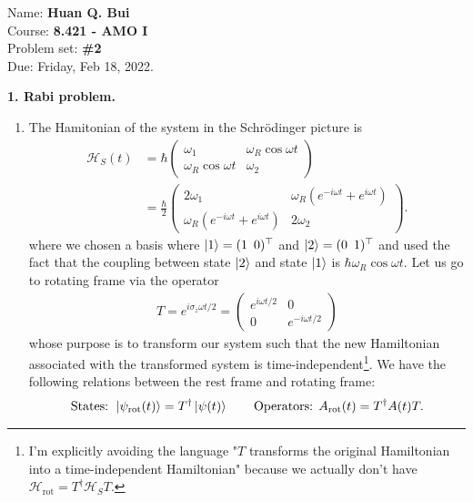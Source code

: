 \documentclass{article}
\theoremstyle{definition}
\newcommand{\ham}{\mathcal{H}}
\newcommand{\f}[2]{\frac{#1}{#2}}
\begin{document}
\begin{framed}
\noindent Name: \textbf{Huan Q. Bui}\\
Course: \textbf{8.421 - AMO I}\\
Problem set: \textbf{\#2}\\
Due: Friday, Feb 18, 2022.
\end{framed}
	
	
\noindent \textbf{1. Rabi problem.}


\begin{enumerate}[label=\alph*)]
	\item The Hamitonian of the system in the Schr\"{o}dinger picture is 
	\begin{align*}
	\ham_S(t) &= \hbar \begin{pmatrix}
	\omega_1 & \omega_R \cos \omega t \\ \omega_R \cos\omega t & \omega_2
	\end{pmatrix} \\
	&= \f{\hbar}{2} \begin{pmatrix}
	2\omega_1 & \omega_R (e^{-i\omega t} + e^{i\omega t}) \\ \omega_R (e^{-i\omega t} + e^{i\omega t}) & 2\omega_2
	\end{pmatrix}.
	\end{align*}
	where we chosen a basis where $\ket{1} = (1 \,\,\, 0)^\top$ and $\ket{2} = (0 \,\,\, 1)^\top$ and used the fact that the coupling between state $\ket{2}$ and state $\ket{1}$ is $\hbar \omega_R \cos\omega t$. Let us go to rotating frame via the operator
	\begin{align*}
	T = e^{i\sigma_z \omega t/2} = \begin{pmatrix}
	e^{i\omega t/2} &  0 \\0  & e^{-i\omega t/2}
	\end{pmatrix} 
	\end{align*}
	whose purpose is to transform our system such that the new Hamiltonian associated with the transformed system is time-independent\footnote{I'm explicitly avoiding the language "$T$ transforms the original Hamiltonian into a time-independent Hamiltonian" because we actually don't have $\ham_\text{rot} = T^\dagger \ham_S T$.}.  We have the following relations between the rest frame and rotating frame:
	\begin{align*}
	\text{States: } \ket{\psi_\text{rot}(t)} = T^\dagger \ket{\psi(t)} \quad\quad \text{Operators: }  A_\text{rot}(t) = T^\dagger A(t) T.
	\end{align*}
	

\end{enumerate}
\end{document}
